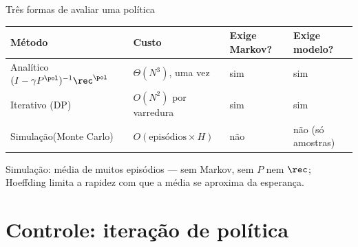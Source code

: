 \documentclass[aspectratio=169, 11pt]{beamer}
\begin{document}
\begin{frame}{Três formas de avaliar uma política}
  \begin{center}
  {\small
  \begin{tabular}{@{}p{3.0cm}p{3.4cm}p{3.0cm}p{3.4cm}@{}}
    \toprule
    \textbf{Método} & \textbf{Custo} & \textbf{Exige Markov?} & \textbf{Exige modelo?} \\
    \midrule
    Analítico\newline $(I-\gamma P^{\pol})^{-1}\rec^{\pol}$
      & $\Theta(N^3)$, uma vez & sim & sim \\[0.4em]
    Iterativo (DP)
      & $O(N^2)$ por varredura & sim & sim \\[0.4em]
    Simulação\newline (Monte Carlo)
      & $O(\text{episódios} \times H)$ & \alert{não} & não (só amostras) \\
    \bottomrule
  \end{tabular}}
  \end{center}
  \vspace{0.3em}
  \begin{ideiabox}
    Simulação: média de muitos episódios --- sem Markov, sem $P$ nem $\rec$; Hoeffding
    limita a rapidez com que a média se aproxima da esperança.
  \end{ideiabox}
\end{frame}

\section{Controle: iteração de política}
\end{document}
